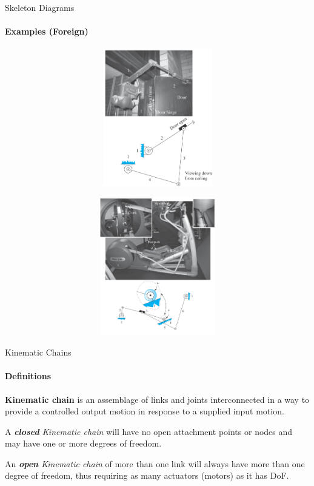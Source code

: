 \documentclass[aspectratio=169]{beamer}
\begin{document}
\begin{frame}[t]{Skeleton Diagrams}
\framesubtitle{Examples (Foreign)}
\vspace{-0.5cm}
\begin{figure}[H]
    \begin{subfigure}{0.49\textwidth}
        \centering\includegraphics[height=6cm,width=1\textwidth,keepaspectratio]{en1_mech.png}
        \label{fig:en1_mech.png}
    \end{subfigure}
    \begin{subfigure}{0.49\textwidth}
        \centering\includegraphics[height=6cm,width=1\textwidth,keepaspectratio]{en2_mech.png}
        \label{fig:en2_mech.png}
    \end{subfigure}
\end{figure}       
\end{frame}

\begin{frame}[t]{Kinematic Chains}
\framesubtitle{Definitions}
\textbf{Kinematic chain} is an assemblage of links and joints interconnected in a way to provide a controlled output motion in response to a supplied input motion.

A \textit{\textbf{closed} Kinematic chain} will have no open attachment 
points or nodes and may have one or more degrees of freedom.

An \textit{\textbf{open} Kinematic chain} of more than one link will always have more than one degree of freedom, thus requiring as many actuators (motors) as it has DoF.
\end{frame}
\end{document}
